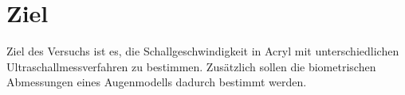 \section{Ziel}
\label{sec:Ziel}

Ziel des Versuchs ist es, die Schallgeschwindigkeit in Acryl mit unterschiedlichen Ultraschallmessverfahren zu bestimmen.
Zusätzlich sollen die biometrischen Abmessungen eines Augenmodells dadurch bestimmt werden.